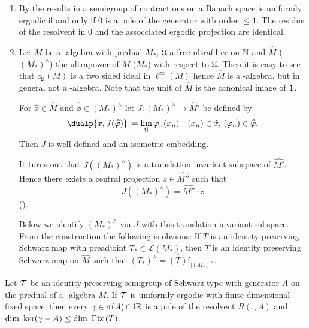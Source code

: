 \begin{remarks}\label{rem:d3-2.4}
\begin{enumerate}[\upshape (i), wide, labelindent=.25em]
\item
By the results in \textcite{lin:1974} a semigroup of contractions on a Banach space is uniformly ergodic if and only if\/ $0$ is a pole of the generator with order $\leq 1$.
The residue of the resolvent in $0$ and the assocciated ergodic projection are identical.

\item
Let $M$ be a \WA-algebra with predual $M_{*}$, $\mathfrak{U}$ a free ultrafilter on $\mathbb{N} $ and $\widehat{M}$ (\resp  $(M_{*})^{\wedge}$) the ultrapower of\/ $M$ (\resp  $M_{*}$) with respect to $\mathfrak{U}$.
Then it is easy to see that $c_{\mathfrak{U}}(M)$ is a two sided ideal in $\ell^{\infty}(M)$ hence $\widehat{M}$ is a \CA-algebra, but in general not a \WA-algebra.
Note that the unit of\/ $\widehat{M}$ is the canonical image of\/ $\mathbf{1}$.

For $\hat{x} \in \widehat{M}$ and $\widehat{\phi} \in (M_{*})^{\wedge}$ let $J: (M_{*})^{\wedge} \to \widehat{M}'$ be defined by
\[
\dualp{x,J(\widehat{\phi})} 
	\coloneq \lim_{\mathfrak{U}}\phi_{n}(x_{n}) \quad 
		(x_{n}) \in \hat{x}, \, (\phi_{n}) \in \widehat{\phi} .
\]
Then $J$ is well defined and an isometric embedding.

It turns out that $J( (M_{*})^{\wedge} )$ is a translation invariant subspace of\/ $\widehat{M'}$.
Hence there exists a central projection $z \in \widehat{M''}$ such that 
%
\[
	J((M_{*})^{\wedge}) = \widehat{M''} \cdot z 
\]
%
(\textcite[Proposition 2.2]{groh:1984b}).

Below we identify $(M_{*})^{\wedge}$ via $J$ with this translation invariant subspace.
From the construction the following is obvious: If\/ $T$ is an identity preserving Schwarz map with preadjoint $T_{*} \in \mathcal{L}(M_{*})$, then $\widehat{T}$ is an identity preserving Schwarz map on $\widehat{M}$ such that $(T_{*})^{\wedge} = \widehat{(T)}{}'_{\vert (M_{*})^{\wedge}}$.
\end{enumerate}
\end{remarks}
\begin{theorem}\label{thm:d3-2.5}
Let $\mathcal{T}$ be an identity preserving semigroup of Schwarz type with generator $A$ on the predual of a \WA-algebra $M$.
If\/ $\mathcal{T}$ is uniformly ergodic with finite dimensional fixed space, then every $\gamma \in \sigma(A) \cap \mathrm{i}\mathbb{R}$ is a pole of the resolvent $R(.,A)$ and $\dim \Kern{\gamma - A} \leq \dim \Fix{T}$.
\end{theorem}
